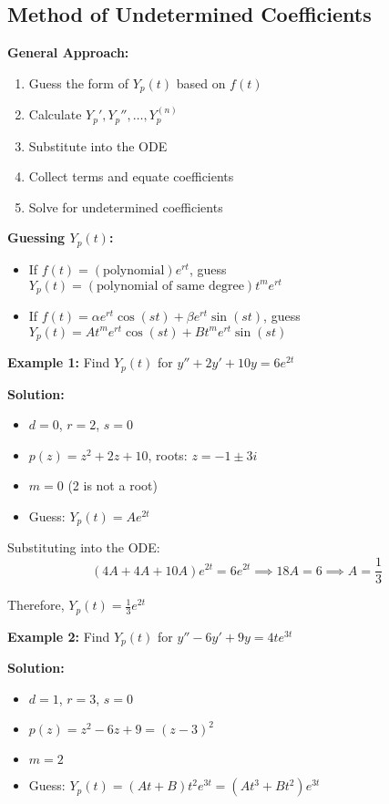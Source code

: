\documentclass{article}
\begin{document}
\subsection*{Method of Undetermined Coefficients}

\textbf{General Approach:}
\begin{enumerate}
    \item Guess the form of $Y_p(t)$ based on $f(t)$
    \item Calculate $Y_p', Y_p'', \ldots, Y_p^{(n)}$
    \item Substitute into the ODE
    \item Collect terms and equate coefficients
    \item Solve for undetermined coefficients
\end{enumerate}

\textbf{Guessing $Y_p(t)$:}
\begin{itemize}
    \item If $f(t) = (\text{polynomial})e^{rt}$, guess $Y_p(t) = (\text{polynomial of same degree})t^m e^{rt}$
    \item If $f(t) = \alpha e^{rt} \cos(st) + \beta e^{rt} \sin(st)$, guess $Y_p(t) = At^m e^{rt} \cos(st) + Bt^m e^{rt} \sin(st)$
\end{itemize}

\textbf{Example 1:} Find $Y_p(t)$ for $y'' + 2y' + 10y = 6e^{2t}$

\textbf{Solution:}
\begin{itemize}
    \item $d = 0$, $r = 2$, $s = 0$
    \item $p(z) = z^2 + 2z + 10$, roots: $z = -1 \pm 3i$
    \item $m = 0$ (2 is not a root)
    \item Guess: $Y_p(t) = Ae^{2t}$
\end{itemize}

Substituting into the ODE:
\[
(4A + 4A + 10A)e^{2t} = 6e^{2t} \implies 18A = 6 \implies A = \frac{1}{3}
\]

Therefore, $Y_p(t) = \frac{1}{3}e^{2t}$

\textbf{Example 2:} Find $Y_p(t)$ for $y'' - 6y' + 9y = 4te^{3t}$

\textbf{Solution:}
\begin{itemize}
    \item $d = 1$, $r = 3$, $s = 0$
    \item $p(z) = z^2 - 6z + 9 = (z - 3)^2$
    \item $m = 2$
    \item Guess: $Y_p(t) = (At + B)t^2e^{3t} = (At^3 + Bt^2)e^{3t}$
\end{itemize}
\end{document}
